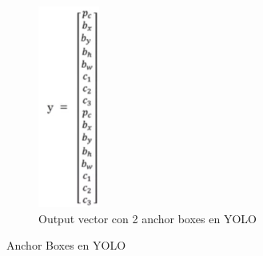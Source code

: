 \begin{figure}[p]
\begin{subfigure}[h!]{.15\textwidth}
        \includegraphics[width=\linewidth]{img/anchor-boxes-yolo-3.png}
        \caption{Output vector con 2 anchor boxes en YOLO}
    \end{subfigure}
    \caption{Anchor Boxes en YOLO}
    \label{fig:anchor boxes en YOLO}
\end{figure}

